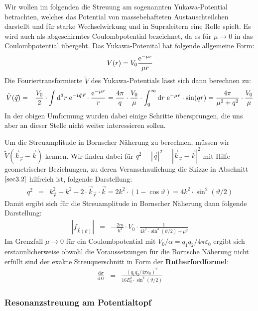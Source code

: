 Wir wollen im folgenden die Streuung am sogenannten Yukawa-Potential betrachten, welches das Potential von massebehafteten Austauschteilchen darstellt und für starke Wechselwirkung und in Supraleitern eine Rolle spielt. Es wird auch als abgeschirmtes  Coulombpotential bezeichnet, da es für $\mu\to0$ in das Coulombpotential übergeht. Das Yukawa-Potenital hat folgende allgemeine Form: 
\begin{eqnarray*}
	V(r) = V_0 \frac{\mathrm{e}^{-\mu r}}{\mu r}
\end{eqnarray*}
Die Fouriertransformierte $\tilde{V}$ des Yukawa-Potentials lässt sich dann berechnen zu: 
\begin{eqnarray*}
	\tilde{V}(\vec{q}) &=& \frac{V_0}{2}\cdot \int\mathrm{d}^3r\; \e^{-\I\vec{q}\,\vec{r}}\cdot\frac{\e^{-\mu r}}{r} = \frac{4\pi}{q} \cdot \frac{V_0}{\mu}\cdot \int_0^{\infty} \mathrm{d}r\; \e^{-\mu r}\cdot \sin(qr) = \frac{4\pi}{\mu^2 + q^2} \cdot \frac{V_0}{\mu}
\end{eqnarray*}
In der obigen Umformung wurden dabei einige Schritte übersprungen, die uns aber an dieser Stelle nicht weiter interessieren sollen. 

Um die Streuamplitude in Bornscher Näherung zu berechnen, müssen wir $\tilde{V}(\vec{k}_{\vec{r}}-\vec{k})$ kennen. Wir finden dabei für $q^2=|\vec{q}|^2=|\vec{k}_{\vec{r}}-\vec{k}|^2$ mit Hilfe geometrischer Beziehungen, zu deren Veranschaulichung die Skizze in Abschnitt $\ref{sec3.2}$ hilfreich ist, folgende Darstellung: 
\begin{eqnarray*}
	q^2 &=& k_{\vec{r}}^2+k^2 - 2\cdot\vec{k}_{\vec{r}}\cdot\vec{k} = 2k^2\cdot(1-\cos\vartheta) = 4 k^2\cdot \sin^2(\vartheta/2)
\end{eqnarray*}
Damit ergibt sich für die Streuamplitude in Bornscher Näherung dann folgende Darstellung:
\begin{eqnarray*}
	|f_{\vec{k}(\vartheta)}| &=& - \frac{2m}{\hbar^2} \cdot V_0\cdot \frac{1}{4 k^2\cdot\sin^2(\vartheta/2)+\mu^2} 
\end{eqnarray*}
Im Grenzfall $\mu\to0$ für ein Coulombpotential mit $V_0/\alpha=q_1q_2/4\pi\varepsilon_0$ ergibt sich erstaunlicherweise obwohl die Voraussetzungen für die Bornsche Näherung nicht erfüllt sind der exakte Streuquerschnitt in Form der {\bf Rutherfordformel}: 
\begin{eqnarray*}
	\frac{\mathrm{d}\sigma}{\mathrm{d}\Omega} &=& \frac{(q_1q_2/4\pi\varepsilon_0)^2}{16E_k^2\cdot \sin^4(\vartheta/2)}
\end{eqnarray*}


\subsubsection{Resonanzstreuung am Potentialtopf}

